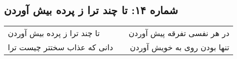 \begin{center}
\section*{شماره ۱۴: تا چند ترا ز پرده بیش آوردن}
\label{sec:014}
\begin{longtable}{l p{0.5cm} r}
تا چند ترا ز پرده بیش آوردن
&&
در هر نفسی تفرقه پیش آوردن
\\
دانی که عذاب سختتر چیست ترا
&&
تنها بودن روی به خویش آوردن
\\
\end{longtable}
\end{center}
